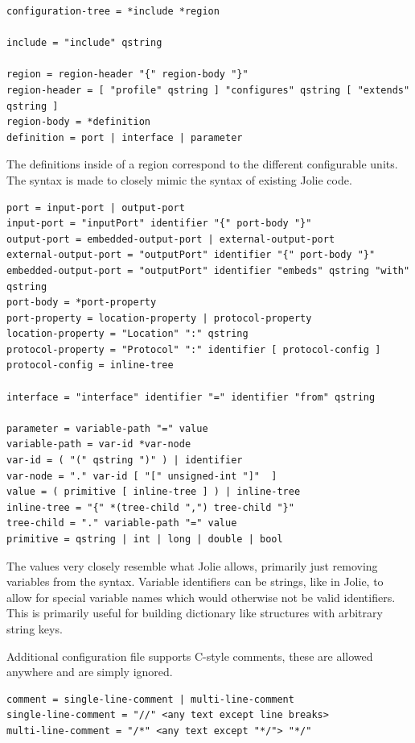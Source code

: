 \begin{verbatim}
configuration-tree = *include *region

include = "include" qstring

region = region-header "{" region-body "}"
region-header = [ "profile" qstring ] "configures" qstring [ "extends" qstring ]
region-body = *definition
definition = port | interface | parameter
\end{verbatim}

The definitions inside of a region correspond to the different configurable
units. The syntax is made to closely mimic the syntax of existing Jolie code.

\begin{verbatim}
port = input-port | output-port
input-port = "inputPort" identifier "{" port-body "}"
output-port = embedded-output-port | external-output-port
external-output-port = "outputPort" identifier "{" port-body "}"
embedded-output-port = "outputPort" identifier "embeds" qstring "with" qstring
port-body = *port-property
port-property = location-property | protocol-property
location-property = "Location" ":" qstring
protocol-property = "Protocol" ":" identifier [ protocol-config ]
protocol-config = inline-tree

interface = "interface" identifier "=" identifier "from" qstring

parameter = variable-path "=" value
variable-path = var-id *var-node
var-id = ( "(" qstring ")" ) | identifier
var-node = "." var-id [ "[" unsigned-int "]"  ]
value = ( primitive [ inline-tree ] ) | inline-tree
inline-tree = "{" *(tree-child ",") tree-child "}"
tree-child = "." variable-path "=" value
primitive = qstring | int | long | double | bool
\end{verbatim}

The values very closely resemble what Jolie allows, primarily just removing
variables from the syntax. Variable identifiers can be strings, like in Jolie,
to allow for special variable names which would otherwise not be
valid identifiers. This is primarily useful for building dictionary like
structures with arbitrary string keys.

Additional configuration file supports C-style comments, these are allowed
anywhere and are simply ignored.

\begin{verbatim}
comment = single-line-comment | multi-line-comment
single-line-comment = "//" <any text except line breaks>
multi-line-comment = "/*" <any text except "*/"> "*/"
\end{verbatim}

